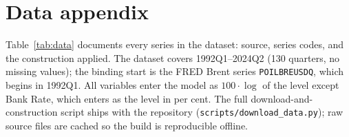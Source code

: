 \appendix

\section{Data appendix}
\label{app:data}

Table~\ref{tab:data} documents every series in the dataset: source, series codes, and the construction applied. The dataset covers 1992Q1--2024Q2 (130 quarters, no missing values); the binding start is the FRED Brent series \texttt{POILBREUSDQ}, which begins in 1992Q1. All variables enter the model as $100\cdot\log$ of the level except Bank Rate, which enters as the level in per cent. The full download-and-construction script ships with the repository (\texttt{scripts/download\_data.py}); raw source files are cached so the build is reproducible offline.

